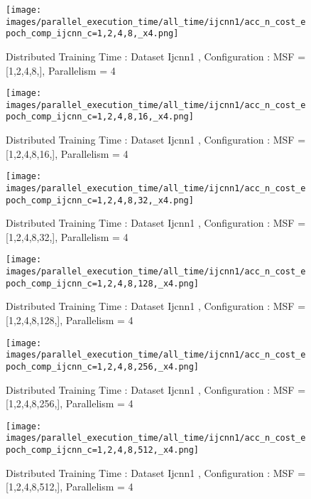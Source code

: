 \begin{figure*}[htbp]
\centering
\texttt{[image: images/parallel\_execution\_time/all\_time/ijcnn1/acc\_n\_cost\_epoch\_comp\_ijcnn\_c=1,2,4,8,\_x4.png]}
\caption{Distributed Training Time : Dataset Ijcnn1 , Configuration : MSF = [1,2,4,8,], Parallelism = 4}
\label{fig:dis-msf-tr-time-ijcnn1-x4}
\end{figure*}


\begin{figure*}[htbp]
\centering
\texttt{[image: images/parallel\_execution\_time/all\_time/ijcnn1/acc\_n\_cost\_epoch\_comp\_ijcnn\_c=1,2,4,8,16,\_x4.png]}
\caption{Distributed Training Time : Dataset Ijcnn1 , Configuration : MSF = [1,2,4,8,16,], Parallelism = 4}
\label{fig:dis-msf-tr-time-ijcnn1-x4}
\end{figure*}


\begin{figure*}[htbp]
\centering
\texttt{[image: images/parallel\_execution\_time/all\_time/ijcnn1/acc\_n\_cost\_epoch\_comp\_ijcnn\_c=1,2,4,8,32,\_x4.png]}
\caption{Distributed Training Time : Dataset Ijcnn1 , Configuration : MSF = [1,2,4,8,32,], Parallelism = 4}
\label{fig:dis-msf-tr-time-ijcnn1-x4}
\end{figure*}


\begin{figure*}[htbp]
\centering
\texttt{[image: images/parallel\_execution\_time/all\_time/ijcnn1/acc\_n\_cost\_epoch\_comp\_ijcnn\_c=1,2,4,8,128,\_x4.png]}
\caption{Distributed Training Time : Dataset Ijcnn1 , Configuration : MSF = [1,2,4,8,128,], Parallelism = 4}
\label{fig:dis-msf-tr-time-ijcnn1-x4}
\end{figure*}


\begin{figure*}[htbp]
\centering
\texttt{[image: images/parallel\_execution\_time/all\_time/ijcnn1/acc\_n\_cost\_epoch\_comp\_ijcnn\_c=1,2,4,8,256,\_x4.png]}
\caption{Distributed Training Time : Dataset Ijcnn1 , Configuration : MSF = [1,2,4,8,256,], Parallelism = 4}
\label{fig:dis-msf-tr-time-ijcnn1-x4}
\end{figure*}


\begin{figure*}[htbp]
\centering
\texttt{[image: images/parallel\_execution\_time/all\_time/ijcnn1/acc\_n\_cost\_epoch\_comp\_ijcnn\_c=1,2,4,8,512,\_x4.png]}
\caption{Distributed Training Time : Dataset Ijcnn1 , Configuration : MSF = [1,2,4,8,512,], Parallelism = 4}
\label{fig:dis-msf-tr-time-ijcnn1-x4}
\end{figure*}



